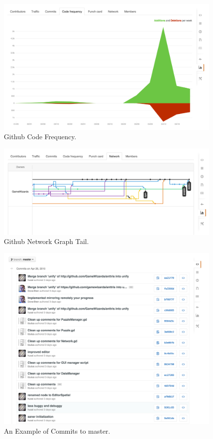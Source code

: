 \documentclass[12pt]{article}
\begin{document}
\begin{figure}[H]
        \centering
        \includegraphics[width=4.5in]{codefrequency.png}
        \caption{Github Code Frequency.}\label{code:freq}
\end{figure}

\begin{figure}[H]
        \centering
        \includegraphics[width=4.5in]{networkgraph.png}
        \caption{Github Network Graph Tail.}\label{code:graph}
\end{figure}

\begin{figure}[H]
        \centering
        \includegraphics[width=4.5in]{commitsexample.png}
        \caption{An Example of Commits to master.}\label{code:commits}
\end{figure}
\end{document}
